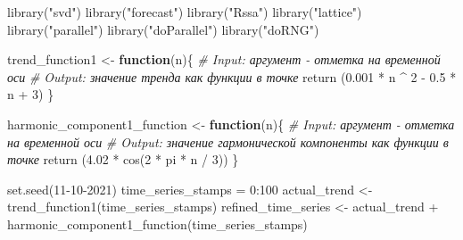 \documentclass[
]{article}
\author{}
\date{\vspace{-2.5em}}
\newenvironment{Shaded}{\begin{snugshade}}{\end{snugshade}}
\newcommand{\CommentTok}[1]{\textcolor[rgb]{0.56,0.35,0.01}{\textit{#1}}}
\newcommand{\ControlFlowTok}[1]{\textcolor[rgb]{0.13,0.29,0.53}{\textbf{#1}}}
\newcommand{\DecValTok}[1]{\textcolor[rgb]{0.00,0.00,0.81}{#1}}
\newcommand{\FloatTok}[1]{\textcolor[rgb]{0.00,0.00,0.81}{#1}}
\newcommand{\FunctionTok}[1]{\textcolor[rgb]{0.00,0.00,0.00}{#1}}
\newcommand{\NormalTok}[1]{#1}
\newcommand{\OtherTok}[1]{\textcolor[rgb]{0.56,0.35,0.01}{#1}}
\newcommand{\SpecialCharTok}[1]{\textcolor[rgb]{0.00,0.00,0.00}{#1}}
\newcommand{\StringTok}[1]{\textcolor[rgb]{0.31,0.60,0.02}{#1}}
\begin{document}
\begin{Shaded}
\begin{Highlighting}[]
  \FunctionTok{library}\NormalTok{(}\StringTok{"svd"}\NormalTok{)}
  \FunctionTok{library}\NormalTok{(}\StringTok{"forecast"}\NormalTok{)}
  \FunctionTok{library}\NormalTok{(}\StringTok{"Rssa"}\NormalTok{)}
  \FunctionTok{library}\NormalTok{(}\StringTok{"lattice"}\NormalTok{)}
  \FunctionTok{library}\NormalTok{(}\StringTok{"parallel"}\NormalTok{)}
  \FunctionTok{library}\NormalTok{(}\StringTok{"doParallel"}\NormalTok{)}
  \FunctionTok{library}\NormalTok{(}\StringTok{"doRNG"}\NormalTok{)}
\end{Highlighting}
\end{Shaded}

\begin{Shaded}
\begin{Highlighting}[]
\NormalTok{    trend\_function1 }\OtherTok{\textless{}{-}} \ControlFlowTok{function}\NormalTok{(n)\{}
      \CommentTok{\# Input: аргумент {-} отметка на временной оси}
      \CommentTok{\# Output: значение тренда как функции в точке}
      \FunctionTok{return}\NormalTok{ (}\FloatTok{0.001} \SpecialCharTok{*}\NormalTok{ n }\SpecialCharTok{\^{}} \DecValTok{2} \SpecialCharTok{{-}} \FloatTok{0.5} \SpecialCharTok{*}\NormalTok{ n }\SpecialCharTok{+} \DecValTok{3}\NormalTok{)}
\NormalTok{    \}}
\end{Highlighting}
\end{Shaded}

\begin{Shaded}
\begin{Highlighting}[]
\NormalTok{  harmonic\_component1\_function }\OtherTok{\textless{}{-}} \ControlFlowTok{function}\NormalTok{(n)\{}
    \CommentTok{\# Input: аргумент {-} отметка на временной оси}
    \CommentTok{\# Output: значение гармонической компоненты как функции в точке}
    \FunctionTok{return}\NormalTok{ (}\FloatTok{4.02} \SpecialCharTok{*} \FunctionTok{cos}\NormalTok{(}\DecValTok{2} \SpecialCharTok{*}\NormalTok{ pi }\SpecialCharTok{*}\NormalTok{ n }\SpecialCharTok{/} \DecValTok{3}\NormalTok{))}
\NormalTok{  \}}
\end{Highlighting}
\end{Shaded}

\begin{Shaded}
\begin{Highlighting}[]
  \FunctionTok{set.seed}\NormalTok{(}\DecValTok{11{-}10{-}2021}\NormalTok{)}
\NormalTok{  time\_series\_stamps }\OtherTok{=} \DecValTok{0}\SpecialCharTok{:}\DecValTok{100}
\NormalTok{  actual\_trend }\OtherTok{\textless{}{-}} \FunctionTok{trend\_function1}\NormalTok{(time\_series\_stamps)}
\NormalTok{  refined\_time\_series }\OtherTok{\textless{}{-}}\NormalTok{ actual\_trend }\SpecialCharTok{+} \FunctionTok{harmonic\_component1\_function}\NormalTok{(time\_series\_stamps)}
\end{Highlighting}
\end{Shaded}
\end{document}
